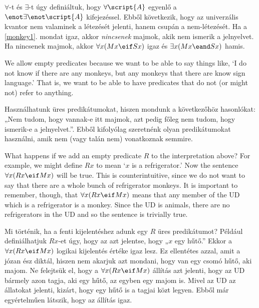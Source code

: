 $\forall$-t és $\exists$-t úgy definiáltuk, hogy $\forall\script{A}$ egyenlő a $\enot \exists\enot \script{A}$ kifejezéssel. Ebből következik, hogy az univerzális kvantor nem valaminek a létezését jelenti, hanem csupán a nem-létezését. Ha a \ref{monkey1}. mondat igaz, akkor \emph{nincsenek} majmok, akik nem ismerik a jelnyelvet. Ha nincsenek majmok, akkor $\forall x(Mx \eif Sx)$ igaz és $\exists x(Mx \eand Sx)$ hamis.

We allow empty predicates because we want to be able to say things like, `I do not know if there are any monkeys, but any monkeys that there are know sign language.' That is, we want to be able to have predicates that do not (or might not) refer to anything.

Használhatunk üres predikátumokat, hiszen mondunk a következőhöz hasonlókat: „Nem tudom, hogy vannak-e itt majmok, azt pedig főleg nem tudom, hogy ismerik-e a jelnyelvet.”. Ebből kifolyólag szeretnénk olyan predikátumokat használni, amik nem (vagy talán nem) vonatkoznak semmire.


What happens if we add an empty predicate $R$ to the interpretation above? For example, we might define $Rx$ to mean `$x$ is a refrigerator.' Now the sentence $\forall x(Rx \eif Mx)$ will be true. This is counterintuitive, since we do not want to say that there are a whole bunch of refrigerator monkeys. It is important to remember, though, that $\forall x(Rx \eif Mx)$ means that any member of the UD which is a refrigerator is a monkey. Since the UD is animals, there are no refrigerators in the UD and so the sentence is trivially true.

Mi történik, ha a fenti kijelentéshez adunk egy $R$ üres predikátumot? Például definiálhatjuk $Rx$-et úgy, hogy az azt jelentse, hogy „$x$ egy hűtő.” Ekkor a $\forall x(Rx \eif Mx)$ logikai kijelentés értéke igaz lesz. Ez ellentétes azzal, amit a józan ész diktál, hiszen nem akarjuk azt mondani, hogy van egy csomó hűtő, aki majom. Ne felejtsük el, hogy a  $\forall x(Rx \eif Mx)$ állítás azt jelenti, hogy az UD bármely azon tagja, aki egy hűtő, az egyben egy majom is. Mivel az UD az állatokat jelenti, kizárt, hogy egy hűtő is a tagjai közt legyen. Ebből már egyértelműen látszik, hogy az állítás igaz.

